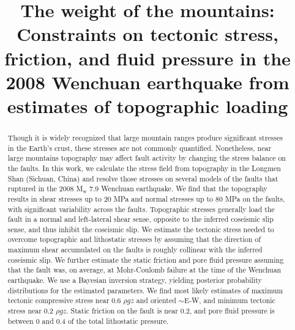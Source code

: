 \documentclass[draft,jgrga]{AGUTeX}
\begin{document}
\title{The weight of the mountains: Constraints on tectonic stress, friction,
       and fluid pressure in the 2008 Wenchuan earthquake from estimates of 
       topographic loading}






\begin{abstract}
Though it is widely recognized that large mountain ranges produce
significant stresses in the Earth's crust, these stresses are not
commonly quantified.  Nonetheless, near large mountains topography may
affect fault activity by changing the stress balance on the faults. In
this work, we calculate the stress field from topography in the
Longmen Shan (Sichuan, China) and resolve those stresses on several
models of the faults that ruptured in the 2008 M$_\mathrm{w}$ 7.9
Wenchuan earthquake. We find that the topography results in shear
stresses up to 20 MPa and normal stresses up to 80 MPa on the faults,
with significant variability across the faults. Topographic stresses
generally load the fault in a normal and left-lateral shear sense,
opposite to the inferred coseismic slip sense, and thus inhibit the
coseismic slip. We estimate the tectonic stress needed to overcome
topographic and lithostatic stresses by assuming that the direction of
maximum shear accumulated on the faults is roughly collinear with the
inferred coseismic slip.  We further estimate the static friction and
pore fluid pressure assuming that the fault was, on average, at
Mohr-Coulomb failure at the time of the Wenchuan earthquake. We use a
Bayesian inversion strategy, yielding posterior probability
distributions for the estimated parameters. We find most likely
estimates of maximum tectonic compressive stress near 0.6 $\rho g z$
and oriented $\sim$E-W, and minimum tectonic stress near 0.2 $\rho g
z$. Static friction on the fault is near 0.2, and pore fluid pressure
is between 0 and 0.4 of the total lithostatic
pressure.  \end{abstract}
\end{document}
